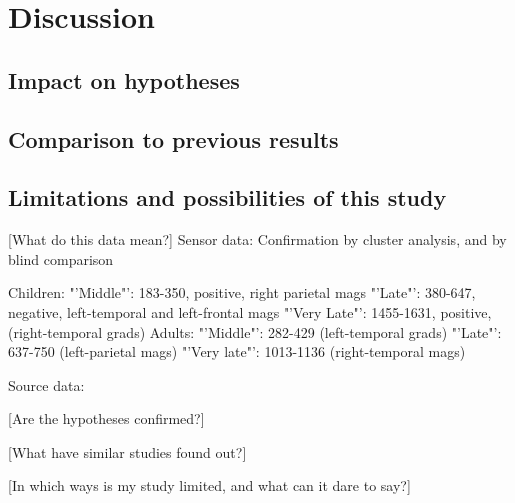 \chapter{Discussion}\label{discussion}

\section{Impact on hypotheses}
\section{Comparison to previous results}
\section{Limitations and possibilities of this study}

[What do this data mean?]
Sensor data:
Confirmation by cluster analysis, and by blind comparison

Children:
"'Middle"': 183-350, positive, right parietal mags
"'Late"': 380-647, negative, left-temporal and left-frontal mags
"'Very Late"': 1455-1631, positive, (right-temporal grads)
Adults:
"'Middle"': 282-429 (left-temporal grads)
"'Late"': 637-750 (left-parietal mags)
"'Very late"': 1013-1136 (right-temporal mags)

Source data:


[Are the hypotheses confirmed?]

[What have similar studies found out?]

[In which ways is my study limited, and what can it dare to say?]
